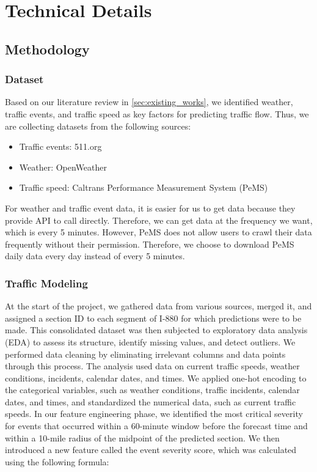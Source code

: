 \chapter{Technical Details}

\section{Methodology}

\subsection{Dataset}
 Based on our literature review in \autoref{sec:existing_works}, we identified weather, traffic events, and traffic speed as key factors for predicting traffic flow. Thus, we are collecting datasets from the following sources:
\begin{itemize}
    \item Traffic events: 511.org
    \item Weather: OpenWeather
    \item Traffic speed: Caltrans Performance Measurement System (PeMS)
\end{itemize}

For weather and traffic event data, it is easier for us to get data because they provide API to call directly. Therefore, we can get data at the frequency we want, which is every 5 minutes. However, PeMS does not allow users to crawl their data frequently without their permission. Therefore, we choose to download PeMS daily data every day instead of every 5 minutes.

\subsection{Traffic Modeling}
At the start of the project, we gathered data from various sources, merged it, and assigned a section ID to each segment of I-880 for which predictions were to be made. This consolidated dataset was then subjected to exploratory data analysis (EDA) to assess its structure, identify missing values, and detect outliers. We performed data cleaning by eliminating irrelevant columns and data points through this process. The analysis used data on current traffic speeds, weather conditions, incidents, calendar dates, and times. We applied one-hot encoding to the categorical variables, such as weather conditions, traffic incidents, calendar dates, and times, and standardized the numerical data, such as current traffic speeds.
In our feature engineering phase, we identified the most critical severity for events that occurred within a 60-minute window before the forecast time and within a 10-mile radius of the midpoint of the predicted section. We then introduced a new feature called the event severity score, which was calculated using the following formula:

